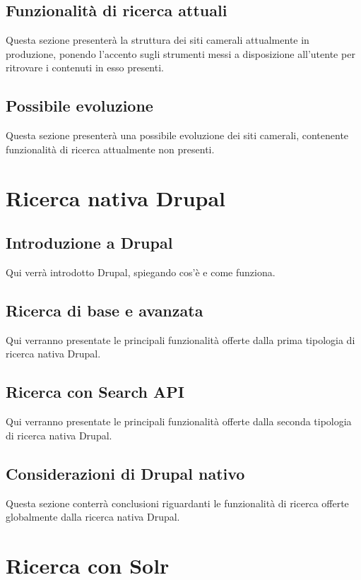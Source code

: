		\subsection{Funzionalità di ricerca attuali}
		Questa sezione presenterà la struttura dei siti camerali attualmente in produzione, ponendo l'accento sugli strumenti messi a disposizione all'utente per ritrovare i contenuti in esso presenti.
		
		\subsection{Possibile evoluzione}
		Questa sezione presenterà una possibile evoluzione dei siti camerali, contenente funzionalità di ricerca attualmente non presenti.

	\section{Ricerca nativa Drupal}

		\subsection{Introduzione a Drupal}
		Qui verrà introdotto Drupal, spiegando cos'è e come funziona.
		
		\subsection{Ricerca di base e avanzata}
		Qui verranno presentate le principali funzionalità offerte dalla prima tipologia di ricerca nativa Drupal.
		
		\subsection{Ricerca con Search API}
		Qui verranno presentate le principali funzionalità offerte dalla seconda tipologia di ricerca nativa Drupal.
		
		\subsection{Considerazioni di Drupal nativo}
		Questa sezione conterrà conclusioni riguardanti le funzionalità di ricerca offerte globalmente dalla ricerca nativa Drupal.

	\section{Ricerca con Solr}

